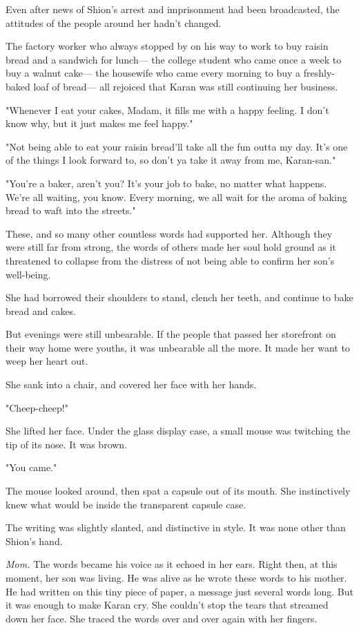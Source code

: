Even after news of Shion's arrest and imprisonment had been broadcasted,
the attitudes of the people around her hadn't changed.

The factory worker who always stopped by on his way to work to buy
raisin bread and a sandwich for lunch--- the college student who came once
a week to buy a walnut cake--- the housewife who came every morning to buy
a freshly-baked loaf of bread--- all rejoiced that Karan was still
continuing her business.

"Whenever I eat your cakes, Madam, it fills me with a happy feeling. I
don't know why, but it just makes me feel happy."

"Not being able to eat your raisin bread'll take all the fun outta my
day. It's one of the things I look forward to, so don't ya take it away
from me, Karan-san."

"You're a baker, aren't you? It's your job to bake, no matter what
happens. We're all waiting, you know. Every morning, we all wait for the
aroma of baking bread to waft into the streets."

These, and so many other countless words had supported her. Although
they were still far from strong, the words of others made her soul hold
ground as it threatened to collapse from the distress of not being able
to confirm her son's well-being.

She had borrowed their shoulders to stand, clench her teeth, and
continue to bake bread and cakes.

But evenings were still unbearable. If the people that passed her
storefront on their way home were youths, it was unbearable all the
more. It made her want to weep her heart out.

She sank into a chair, and covered her face with her hands.

"Cheep-cheep!"

She lifted her face. Under the glass display case, a small mouse was
twitching the tip of its nose. It was brown.

"You came."

The mouse looked around, then spat a capsule out of its mouth. She
instinctively knew what would be inside the transparent capsule case.


The writing was slightly slanted, and distinctive in style. It was none
other than Shion's hand.

\emph{Mom.} The words became his voice as it echoed in her ears. Right then, at
this moment, her son was living. He was alive as he wrote these words to
his mother. He had written on this tiny piece of paper, a message just
several words long. But it was enough to make Karan cry. She couldn't
stop the tears that streamed down her face. She traced the words over
and over again with her fingers.

